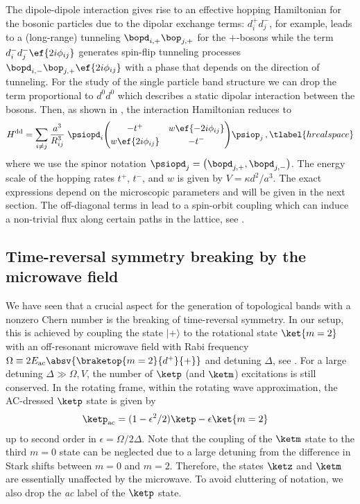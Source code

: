 The dipole-dipole interaction gives rise to an effective hopping Hamiltonian for the bosonic particles due to the dipolar exchange terms:
$d^+_id^-_j$, for example, leads to a (long-range) tunneling $\bopd_{i,+}\bop_{j,+}$ for the ${+}$-bosons while the term $d^-_i d^-_j \ef{2i\phi_{i j}}$ generates spin-flip tunneling processes $\bopd_{i,-}\bop_{j,+} \ef{2i\phi_{ij}}$ with a phase that depends on the direction of tunneling.
For the study of the single particle band structure we can drop the term proportional to $d^0 d^0$ which describes a static dipolar interaction between the bosons.
Then, as shown in , the interaction Hamiltonian reduces to
\begin{align}
    H^{\text{dd}} = \sum_{i\ne j}
    \frac{a^3}{R_{ij}^3}\;
    \psiopd_i\!
    \begingroup
        \renewcommand*{\arraystretch}{1.2}
        \begin{pmatrix}
            -t^+ & w \ef{-2i\phi_{ij}} \\
            w \ef{2i\phi_{ij}} & -t^-
        \end{pmatrix}
    \endgroup\!
    \psiop_j \,,
    \tlabel{hrealspace}
\end{align}
where we use the spinor notation $\psiopd_j = \big( \bopd_{j,+} , \bopd_{j,-} \big)$.
The energy scale of the hopping rates $t^+$, $t^-$, and $w$ is given by $V=\kappa d^2/a^3$. The exact expressions depend on the microscopic parameters and will be given in the next section.
The off-diagonal terms in  lead to a spin-orbit coupling which can induce a non-trivial  flux along certain paths in the lattice, see .

\subsection{Time-reversal symmetry breaking by the microwave field}
We have seen that a crucial aspect for the generation of topological bands with a nonzero Chern number is the breaking of time-reversal symmetry.
In our setup, this is achieved by coupling the state $|+\rangle$ to the rotational state $\ket{m=2}$ with an off-resonant microwave field with Rabi frequency $\Omega \equiv 2 E_\text{ac} \absv{\braketop{m=2}{d^+}{{+}}}$ and detuning $\Delta$, see .
For a large detuning $\Delta \gg \Omega, V$, the number of $\ketp$ (and $\ketm$) excitations is still conserved.
In the rotating frame, within the rotating wave approximation, the AC-dressed $\ketp$ state is given by
\begin{align}
\ketp_\text{ac} &= (1-\epsilon^2/2)\ketp - \epsilon \ket{m=2}
\end{align}
up to second order in $\epsilon=\Omega/2\Delta$.
Note that the coupling of the $\ketm$ state to the third $m=0$ state can be neglected due to a large detuning from the difference in Stark shifts between $m=0$ and $m=2$.
Therefore, the states $\ketz$ and $\ketm$ are essentially unaffected by the microwave.
To avoid cluttering of notation, we also drop the \emph{ac} label of the $\ketp$ state.

